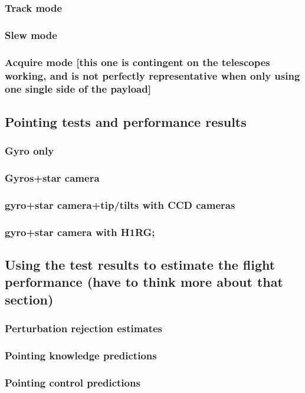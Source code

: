 \subsubsection{Track mode}
\subsubsection{	Slew mode}
\subsubsection{	Acquire mode [this one is contingent on the telescopes working, and is not perfectly representative when only using one single side of the payload]}
\subsection{	Pointing tests and performance results}
\subsubsection{Gyro only}
\subsubsection{	Gyros+star camera}
\subsubsection{	gyro+star camera+tip/tilts with CCD cameras}
\subsubsection{	gyro+star camera with H1RG;}
\subsection{	Using the test results to estimate the flight performance (have to think more about that section)}
\subsubsection{	Perturbation rejection estimates}
\subsubsection{	Pointing knowledge predictions}
\subsubsection{	Pointing control predictions}
